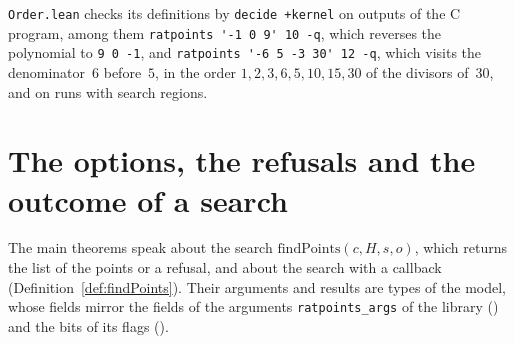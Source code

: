 \verb|Order.lean| checks its definitions by \verb|decide +kernel| on outputs of the C program, among
them \verb|ratpoints '-1 0 9' 10 -q|, which reverses the polynomial to \verb|9 0 -1|, and
\verb|ratpoints '-6 5 -3 30' 12 -q|, which visits the denominator~$6$ before~$5$, in the order
$1, 2, 3, 6, 5, 10, 15, 30$ of the divisors of~$30$, and on runs with search regions.

\section{The options, the refusals and the outcome of a search}\label{sec:specInterface}

The main theorems speak about the search $\mathrm{findPoints}(c, H, s, o)$, which returns the list
of the points or a refusal, and about the search with a callback (Definition~\ref{def:findPoints}).
Their arguments and results are types of the model, whose fields mirror the fields of the arguments
\verb|ratpoints_args| of the library () and the bits of its flags
().

